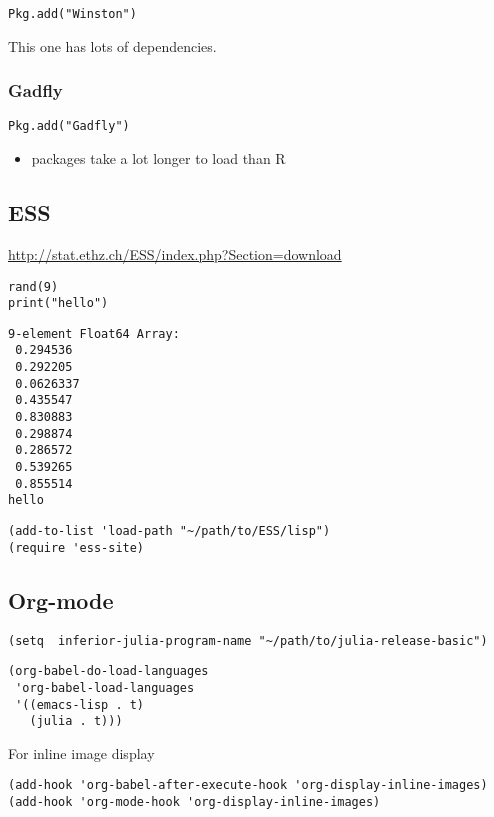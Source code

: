 \documentclass[11pt]{article}
\begin{document}
\begin{verbatim}
Pkg.add("Winston")
\end{verbatim}

This one has lots of dependencies.
\subsubsection[Gadfly]{Gadfly}
\label{sec-1-2-2}


\begin{verbatim}
Pkg.add("Gadfly")
\end{verbatim}

\begin{itemize}
\item packages take a lot longer to load than R
\end{itemize}
\subsection[ESS]{ESS}
\label{sec-1-3}
\url{http://stat.ethz.ch/ESS/index.php?Section=download}

\begin{verbatim}
rand(9)
print("hello")
\end{verbatim}

\begin{verbatim}
9-element Float64 Array:
 0.294536 
 0.292205 
 0.0626337
 0.435547 
 0.830883 
 0.298874 
 0.286572 
 0.539265 
 0.855514
hello
\end{verbatim}

\begin{verbatim}
(add-to-list 'load-path "~/path/to/ESS/lisp")
(require 'ess-site)
\end{verbatim}
\subsection[Org-mode]{Org-mode}
\label{sec-1-4}

\begin{verbatim}
(setq  inferior-julia-program-name "~/path/to/julia-release-basic")
\end{verbatim}

\begin{verbatim}
(org-babel-do-load-languages
 'org-babel-load-languages
 '((emacs-lisp . t)
   (julia . t)))
\end{verbatim}


For inline image display

\begin{verbatim}
(add-hook 'org-babel-after-execute-hook 'org-display-inline-images)   
(add-hook 'org-mode-hook 'org-display-inline-images)
\end{verbatim}
\end{document}
